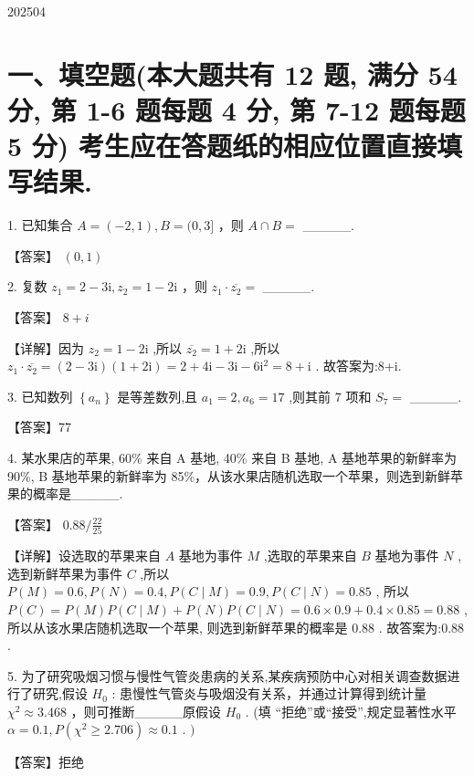 \documentclass[10pt]{article}
\begin{document}
202504

\section*{一、填空题(本大题共有 12 题, 满分 54 分, 第 1-6 题每题 4 分, 第 7-12 题每题 5 分) 考生应在答题纸的相应位置直接填写结果.}

1. 已知集合 \(A = \left( {-2,1}\right) ,B = (0,3\rbrack\) ，则 \(A \cap  B =\) \_\_\_\_\_.

【答案】 \(\left( {0,1}\right)\)

2. 复数 \({z}_{1} = 2 - 3\mathrm{i},{z}_{2} = 1 - 2\mathrm{i}\) ，则 \({z}_{1} \cdot  \overline{{z}_{2}} =\) \_\_\_\_\_.

【答案】 \(8 + i\)

【详解】因为 \({z}_{2} = 1 - 2\mathrm{i}\) ,所以 \(\overline{{z}_{2}} = 1 + 2\mathrm{i}\) ,所以 \({z}_{1} \cdot  \overline{{z}_{2}} = \left( {2 - 3\mathrm{i}}\right) \left( {1 + 2\mathrm{i}}\right)  = 2 + 4\mathrm{i} - 3\mathrm{i} - 6{\mathrm{i}}^{2} = 8 + \mathrm{i}\) . 故答案为:8+i.

3. 已知数列 \(\left\{  {a}_{n}\right\}\) 是等差数列,且 \({a}_{1} = 2,{a}_{6} = {17}\) ,则其前 7 项和 \({S}_{7} =\) \_\_\_\_\_.

【答案】77

4. 某水果店的苹果, 60\% 来自 A 基地, 40\% 来自 B 基地, A 基地苹果的新鲜率为 90\%, B 基地苹果的新鲜率为 85\%，从该水果店随机选取一个苹果，则选到新鲜苹果的概率是\_\_\_\_\_.

【答案】 \({0.88}/\frac{22}{25}\)

【详解】设选取的苹果来自 \(A\) 基地为事件 \(M\) ,选取的苹果来自 \(B\) 基地为事件 \(N\) ,选到新鲜苹果为事件 \(C\) ,所以 \(P\left( M\right)  = {0.6},P\left( N\right)  = {0.4},P\left( {C \mid  M}\right)  = {0.9},P\left( {C \mid  N}\right)  = {0.85}\) , 所以 \(P\left( C\right)  = P\left( M\right) P\left( {C \mid  M}\right)  + P\left( N\right) P\left( {C \mid  N}\right)  = {0.6} \times  {0.9} + {0.4} \times  {0.85} = {0.88}\) , 所以从该水果店随机选取一个苹果, 则选到新鲜苹果的概率是 0.88 . 故答案为:0.88 .

5. 为了研究吸烟习惯与慢性气管炎患病的关系,某疾病预防中心对相关调查数据进行了研究,假设 \({H}_{0}\) : 患慢性气管炎与吸烟没有关系，并通过计算得到统计量 \({\chi }^{2} \approx  {3.468}\) ，则可推断\_\_\_\_\_原假设 \({H}_{0}\) . (填 “拒绝”或“接受”,规定显著性水平 \(\alpha  = {0.1},P\left( {{\chi }^{2} \geq  {2.706}}\right)  \approx  {0.1}\) . \()\)

【答案】拒绝
\end{document}
